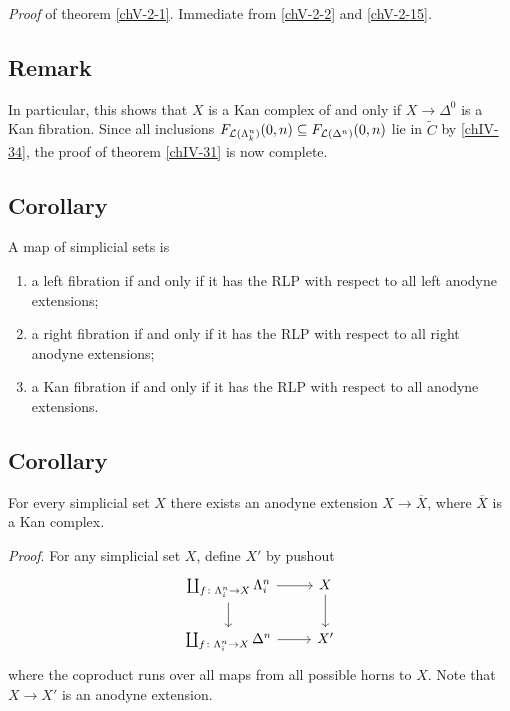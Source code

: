         \emph{Proof} of theorem \ref{chV-2-1}. Immediate from \ref{chV-2-2} and \ref{chV-2-15}.

    \subsection{Remark}\label{chV-2-17}
        In particular, this shows that $X$ is a Kan complex of and only if $X \to \Delta^0$ is a Kan fibration. Since all inclusions $F_{\mathcal{L}(\Lambda^{n}_{k})}(0, n) \subseteq F_{\mathcal{L}(\Delta^n)}(0, n)$ lie in $\widetilde{C}$ by \ref{chIV-34}, the proof of theorem \ref{chIV-31} is now complete.

    \subsection{Corollary}\label{chV-2-18}
        A map of simplicial sets is
        \begin{enumerate}
            \item 
                a left fibration if and only if it has the RLP with respect to all left anodyne extensions;
            \item 
                a right fibration if and only if it has the RLP with respect to all right anodyne extensions;
            \item 
                a Kan fibration if and only if it has the RLP with respect to all anodyne extensions.
        \end{enumerate}

    \subsection{Corollary}\label{chV-2-19}
        For every simplicial set $X$ there exists an anodyne extension $X \to \overline{X}$, where $\overline{X}$ is a Kan complex.
        \smallskip

        \emph{Proof}. For any simplicial set $X$, define $X'$ by pushout
        \begin{equation*}
            \begin{tikzcd}
                \coprod_{f \colon \horn{n}{i} \to X}\horn{n}{i} \arrow[r] \arrow[d] & X \arrow[d] \\
                \coprod_{f \colon \horn{n}{i} \to X}\Delta^n \arrow[r] & X'
            \end{tikzcd}
        \end{equation*}
        where the coproduct runs over all maps from all possible horns to $X$. Note that $X \to X'$ is an anodyne extension.
        
